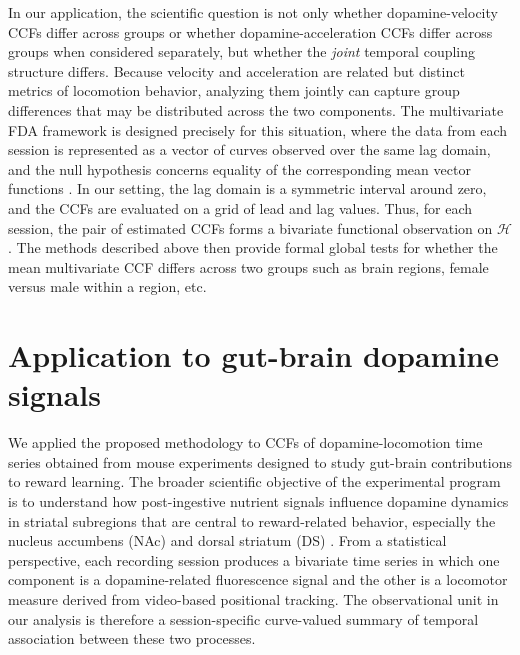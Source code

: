 \documentclass[12pt]{article}
\begin{document}
In our application, the scientific question is not only whether dopamine-velocity CCFs differ across groups or whether dopamine-acceleration CCFs differ across groups when considered separately, but whether the \emph{joint} temporal coupling structure differs. Because velocity and acceleration are related but distinct metrics of locomotion behavior, analyzing them jointly can capture group differences that may be distributed across the two components. The multivariate FDA framework is designed precisely for this situation, where the data from each session is represented as a vector of curves observed over the same lag domain, and the null hypothesis concerns equality of the corresponding mean vector functions \citep{qiu2021multivariate}. 
In our setting, the lag domain is a symmetric interval around zero, and the CCFs are evaluated on a grid of lead and lag values. Thus, for each session, the pair of estimated CCFs forms a bivariate functional observation on \(\mathcal H\). The methods described above then provide formal global tests for whether the mean multivariate CCF differs across two groups such as brain regions, female versus male within a region, etc.

\section{Application to gut-brain dopamine signals}

We applied the proposed methodology to CCFs of dopamine-locomotion time series obtained from mouse experiments designed to study gut-brain contributions to reward learning. The broader scientific objective of the experimental program is to understand how post-ingestive nutrient signals influence dopamine dynamics in striatal subregions that are central to reward-related behavior, especially the nucleus accumbens (NAc) and dorsal striatum (DS) \citep{schultz2016dopamine,dearaujo2012gut,han2018gut}. From a statistical perspective, each recording session produces a bivariate time series in which one component is a dopamine-related fluorescence signal and the other is a locomotor measure derived from video-based positional tracking. The observational unit in our analysis is therefore a session-specific curve-valued summary of temporal association between these two processes.
\end{document}
